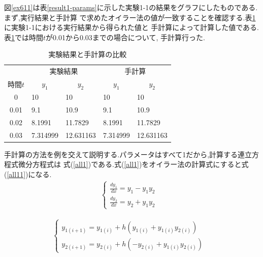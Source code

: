 \documentclass[a4j]{jarticle}
\begin{document}
         図\ref{ex611}は表\ref{result1-params}に示した実験1-1の結果をグラフにしたものである.まず,実行結果と手計算
         で求めたオイラー法の値が一致することを確認する.表\ref{result1-1acc}に実験1-1における実行結果から得られた値と
         手計算によって計算した値である.表\ref{result1-1acc}では時間$t$が0.01から0.03までの場合について,
         手計算行った.
      \begin{table}[H]
        \caption{実験結果と手計算の比較}
      \label{result1-1acc}
      \begin{center}
          \begin{tabular}{c|l l|l l}\hline
             & \multicolumn{2}{c|}{実験結果} & \multicolumn{2}{c}{手計算} \\ \cline{2-5}
             時間$t$ & \multicolumn{1}{c}{$y_1$} & \multicolumn{1}{c|}{$y_2$} & \multicolumn{1}{c}{$y_1$} & \multicolumn{1}{c}{$y_2$} \\ \cline{1-5}
             0 & 10 & 10 & 10 & 10 \\ 
0.01 & 9.1 & 10.9 & 9.1 & 10.9 \\
0.02 & 8.1991 & 11.7829 & 8.1991 & 11.7829 \\
0.03 & 7.314999 & 12.631163 & 7.314999 & 12.631163 \\ \hline
          \end{tabular}
      \end{center}
      \end{table}
      手計算の方法を例を交えて説明する.パラメータはすべて1だから,計算する連立方程式微分方程式は
      式(\ref{all1})である.式(\ref{all1})をオイラー法の計算式にすると式(\ref{all11})になる.
      \begin{eqnarray}
        \begin{cases}
          \frac{dy_1}{dx} = y_1-y_1y_2 & \\
          \frac{dy_2}{dx} = y_2+y_1y_2 &
        \end{cases}
        \label{all1}
      \end{eqnarray}

      \begin{eqnarray}
        \begin{cases}
          y_{1(i+1)} = y_{1(i)}+h(y_{1(i)} + y_{1(i)}y_{2(i)}) & \\
          y_{2(i+1)} = y_{2(i)}+h(-y_{2(i)} + y_{1(i)}y_{2(i)}) &
        \end{cases}
        \label{all11}
      \end{eqnarray}
\end{document}

